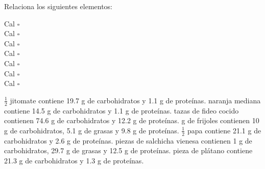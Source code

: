 Relaciona los siguientes elementos:
\begin{multicols}{2}
    \begin{choices}
         Cal  $\square$\\ \vspace{0.5cm}
         Cal  $\square$\\ \vspace{0.5cm}
         Cal  $\square$\\ \vspace{0.5cm}
         Cal $\square$\\ \vspace{0.5cm}
         Cal $\square$\\ \vspace{0.5cm}
         Cal  $\square$\\ \vspace{0.5cm}
         Cal $\square$\\ \vspace{0.5cm}
    \end{choices}
    \begin{checkboxes}
        \choice $\frac{1}{2}$ jitomate contiene 19.7 g de carbohidratos y 1.1 g de proteínas.
         naranja mediana contiene 14.5 g de carbohidratos y 1.1 g de proteínas.
         tazas de fideo cocido contienen 74.6 g de carbohidratos y 12.2 g de proteínas.
         g de frijoles contienen 10 g de carbohidratos, 5.1 g de grasas y 9.8 g de proteínas.
        \choice $\frac{1}{2}$ papa contiene 21.1 g de carbohidratos y 2.6 g de proteínas.
         piezas de salchicha vienesa contienen 1 g de carbohidratos, 29.7 g de grasas y 12.5 g de proteínas.
         pieza de plátano contiene 21.3 g de carbohidratos y 1.3 g de proteínas.
    \end{checkboxes}
\end{multicols}